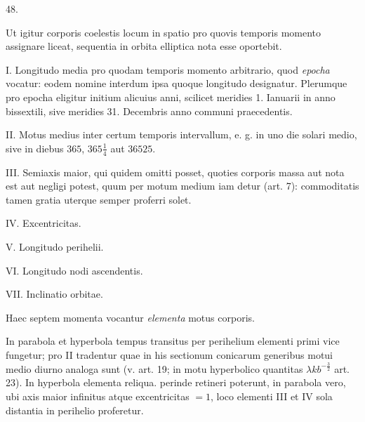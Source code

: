 \begin{center}
\hypertarget{native-066-article048}{}48.
\end{center}
Ut igitur corporis coelestis locum in spatio pro quovis temporis momento assignare liceat, sequentia in orbita elliptica nota esse oportebit.

I. Longitudo media pro quodam temporis momento arbitrario, quod \emph{epocha} vocatur: eodem nomine interdum ipsa quoque longitudo designatur. Plerumque pro epocha eligitur initium alicuius anni, scilicet meridies 1. Ianuarii in anno bissextili, sive meridies 31. Decembris anno communi praecedentis.

II. Motus medius inter certum temporis intervallum, e. g. in uno die solari medio, sive in diebus $365$, $365\tfrac{1}{4}$ aut $36525$.

III. Semiaxis maior, qui quidem omitti posset, quoties corporis massa aut nota est aut negligi potest, quum per motum medium iam detur (art. 7): commoditatis tamen gratia uterque semper proferri solet.

IV. Excentricitas.

V. Longitudo perihelii.

VI. Longitudo nodi ascendentis.

VII. Inclinatio orbitae.

Haec septem momenta vocantur \emph{elementa} motus corporis.

In parabola et hyperbola tempus transitus per perihelium elementi primi vice fungetur; pro II tradentur quae in his sectionum conicarum generibus motui medio diurno analoga sunt (v. art. 19; in motu hyperbolico quantitas $\lambda k b^{-\frac{3}{2}}$ art. 23). In hyperbola elementa reliqua. perinde retineri poterunt, in parabola vero, ubi axis maior infinitus atque excentricitas $=1$, loco elementi III et IV sola distantia in perihelio proferetur.

